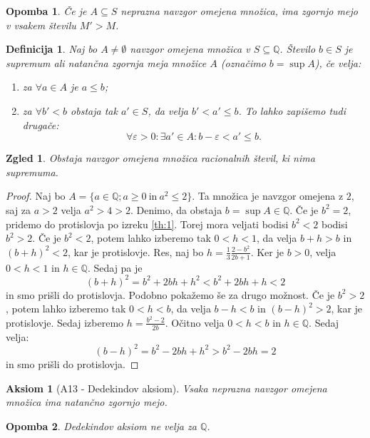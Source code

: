\documentclass[10pt, a4paper]{article}
\newtheorem{defi}[izr]{Definicija}
\newtheorem{aksiom}{Aksiom}[section]
\newenvironment{noticeB}{%
  \tcolorbox[%
  notitle,
  empty,
  enhanced,  %
  breakable,
  coltext=black,
  colback=white, 
  fontupper=\rmfamily,
  noparskip,
  sharp corners,
  boxrule=-1pt,  %
  frame hidden,
  left=7pt,  %
  right=7pt,
  top=5pt,
  bottom=5pt,
  before skip=2.5ex plus 2pt,
  after skip=2.5ex plus 2pt,
  borderline west = {1.5pt}{-0.1pt}{blue!30!black}, %
  overlay unbroken and last={%
    \draw[color=black, line width=1.25pt]
    ($(frame.south west)+(1.pt, -0.1pt)$) -- ++(2em, 0);
  }
  ]}
{\endtcolorbox}
\newenvironment{definicija}{\begin{noticeB}\begin{defi}}{%
\end{defi}\end{noticeB}}
\newtheorem*{opomba}{Opomba}
\newtheorem{zgled}[izr]{Zgled}
\newenvironment{noticeC}{%
  \tcolorbox[%
  notitle,
  empty,
  enhanced,  %
  breakable,
  coltext=black, 
  fontupper=\rmfamily,
  noparskip,
  sharp corners,
  boxrule=-1pt,  %
  frame hidden,
  left=7pt,  %
  right=7pt,
  top=5pt,
  bottom=5pt,
  before skip=2.5ex plus 2pt,
  after skip=2.5ex plus 2pt,
  overlay unbroken and last={%
  },
  ]}
{\endtcolorbox}
\newenvironment{dokaz}%
  {\begin{noticeC}\begin{proof}}%
  {\end{proof}\end{noticeC}}
\newcommand{\Q}{\mathbb {Q}}
\begin{document}
\begin{opomba}
    Če je $A \subseteq S$ neprazna navzgor omejena množica, ima zgornjo mejo v vsakem številu $M'>M$.
\end{opomba}
    
\begin{definicija}
    Naj bo $A \neq \emptyset$ navzgor omejena množica v $S \subseteq \mathbb{Q}$. Število $b \in S$ je {supremum} ali natančna zgornja meja množice $A$ (označimo $b = \sup A$), če velja:
    \begin{enumerate}
    \item za $\forall a \in A$ je $a\leq b$;
    \item za $\forall b'<b$ obstaja tak $a' \in S$, da velja $b' < a' \leq b$. To lahko zapišemo tudi drugače: $$\forall \varepsilon > 0: \exists a' \in A: b-\varepsilon < a' \leq b.$$
    \end{enumerate}
\end{definicija}
    
\begin{zgled}
    Obstaja navzgor omejena množica racionalnih števil, ki nima supremuma.
\end{zgled}    
    \begin{dokaz}
    Naj bo $A = \{a \in \mathbb{Q}; a\geq 0\ \text{in}\ a^2 \leq 2\}$.
    Ta množica je navzgor omejena z $2$, saj za $a > 2 $ velja $a^2 > 4 > 2$.
     Denimo, da obstaja $b = \sup A \in \mathbb{Q}$.
        Če je $b^2=2$, pridemo do protislovja po izreku \ref{th:1}. Torej mora veljati bodisi $b^2<2$ bodisi $b^2>2$.
        Če je $b^2<2$, potem lahko izberemo tak $0<h<1$, da velja $b+h>b$ in $(b+h)^2<2$, kar je protislovje.
        Res, naj bo $h = \frac{1}{3} \frac{2-b^2}{2b+1}$. Ker je $b > 0$, velja $0 < h < 1$ in $h \in \Q$.
        Sedaj pa je $$(b+h)^2 = b^2 + 2bh + h^2 < b^2 + 2bh + h < 2$$ in smo prišli do protislovja.
        Podobno pokažemo še za drugo možnost. Če je $b^2>2$, potem lahko izberemo tak $0<h<b$, da velja $b-h<b$ in $(b-h)^2>2$, kar je protislovje.
        Sedaj izberemo $h = \frac{b^2-2}{2b}$. Očitno velja $0 < h < b$ in $h \in \Q$.
        Sedaj velja: $$(b-h)^2 = b^2 - 2bh + h^2 > b^2 - 2bh = 2$$ in smo prišli do protislovja.
    \end{dokaz}


\begin{aksiom}[A13 - Dedekindov aksiom]
    Vsaka neprazna navzgor omejena množica ima natančno zgornjo mejo.
\end{aksiom}

\begin{opomba}
    Dedekindov aksiom ne velja za $\mathbb{Q}$.
\end{opomba}
\end{document}
